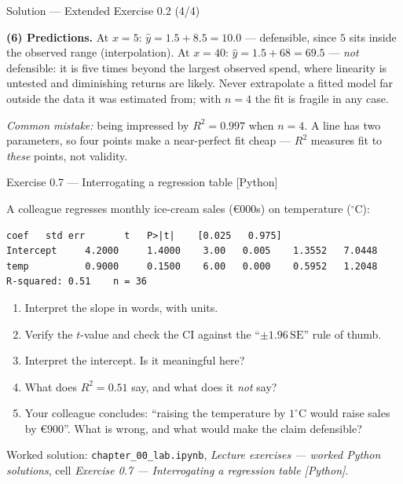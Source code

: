 \documentclass[aspectratio=169,11pt]{beamer}
\begin{document}
\begin{frame}{Solution --- Extended Exercise 0.2 (4/4)}
  \begin{solutionbox}
    \textbf{(6) Predictions.} At $x = 5$: $\hat y = 1.5 + 8.5 = 10.0$ ---
    defensible, since $5$ sits inside the observed range (interpolation). At
    $x = 40$: $\hat y = 1.5 + 68 = 69.5$ --- \emph{not} defensible: it is
    five times beyond the largest observed spend, where linearity is
    untested and diminishing returns are likely. Never extrapolate a fitted
    model far outside the data it was estimated from; with $n = 4$ the fit
    is fragile in any case.

    \smallskip
    \textit{Common mistake:} being impressed by $R^2 = 0.997$ when $n = 4$.
    A line has two parameters, so four points make a near-perfect fit cheap
    --- $R^2$ measures fit to \emph{these} points, not validity.
  \end{solutionbox}
\end{frame}

\begin{frame}[fragile]{Exercise 0.7 --- Interrogating a regression table [Python]}
  \begin{exercise}
    \scriptsize
    A colleague regresses monthly ice-cream sales (\euro 000s) on temperature ($^\circ$C):
\begin{lstlisting}[basicstyle=\ttfamily\scriptsize,aboveskip=3pt,belowskip=1pt]
                coef   std err       t   P>|t|    [0.025   0.975]
Intercept     4.2000     1.4000    3.00   0.005    1.3552   7.0448
temp          0.9000     0.1500    6.00   0.000    0.5952   1.2048
R-squared: 0.51    n = 36
\end{lstlisting}
    \begin{enumerate}
      \item Interpret the slope in words, with units.
      \item Verify the $t$-value and check the CI against the
            ``$\pm 1.96\,\mathrm{SE}$'' rule of thumb.
      \item Interpret the intercept. Is it meaningful here?
      \item What does $R^2 = 0.51$ say, and what does it \emph{not} say?
      \item Your colleague concludes: ``raising the temperature by
            $1^\circ$C would raise sales by \euro 900''. What is wrong,
            and what would make the claim defensible?
    \end{enumerate}
  \end{exercise}
  \vspace{-9pt}
  \begin{labnote}
    \scriptsize Worked solution: \texttt{chapter\_00\_lab.ipynb}, \emph{Lecture
    exercises --- worked Python solutions}, cell \emph{Exercise 0.7 ---
    Interrogating a regression table [Python]}.
  \end{labnote}
\end{frame}
\end{document}
